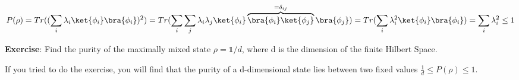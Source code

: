 \begin{equation}
    P(\rho) = Tr((\sum_i \lambda_i \ket{\phi_i} \bra{\phi_i})^2) = Tr(\sum_i \sum_j \lambda_i \lambda_j \ket{\phi_i} \overbrace{\bra{\phi_i} \ket{\phi_j}}^{= \delta_{ij}} \bra{\phi_j}) = Tr( \sum_i \lambda_i^2 \ket{\phi_i} \bra{\phi_i}) = \sum_i \lambda_i^2 \leq 1
\end{equation}
 
\textbf{Exercise}: Find the purity of the maximally mixed state $\rho = \mathds{1}/d$, where d is the dimension of the finite Hilbert Space.
 

If you tried to do the exercise, you will find that the purity of a d-dimensional state lies between two fixed values $\frac{1}{d} \leq P(\rho) \leq 1$.
